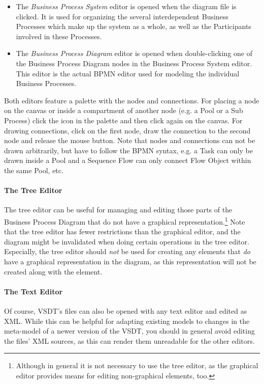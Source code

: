 \begin{itemize}
	\item The \emph{Business Process System} editor is opened when the diagram
	file is clicked.  It is used for organizing the several interdependent Business
	Processes which make up the system as a whole, as well as the Participants
	involved in these Processes.
	
	\item The \emph{Business Process Diagram} editor is opened when double-clicking
	one of the Business Process Diagram nodes in the Business Process System
	editor.  This editor is the actual BPMN editor used for modeling the
	individual Business Processes.
\end{itemize}

Both editors feature a palette with the nodes and connections.  For placing a
node on the canvas or inside a compartment of another node (e.g. a Pool or a Sub
Process) click the icon in the palette and then click again on the canvas.  For
drawing connections, click on the first node, draw the connection to the second
node and release the mouse button.  Note that nodes and connections can not be
drawn arbitrarily, but have to follow the BPMN syntax, e.g. a Task can only be
drawn inside a Pool and a Sequence Flow can only connect Flow Object within the
same Pool, etc.

\paragraph*{The Tree Editor}
The tree editor can be useful for managing and editing those parts of the Business
Process Diagram that do not have a graphical representation.\footnote{Although in
general it is not necessary to use the tree editor, as the graphical editor
provides means for editing non-graphical elements, too.} Note that the tree editor
has fewer restrictions than the graphical editor, and the diagram might be
invalidated when doing certain operations in the tree editor.  Especially, the
tree editor should \emph{not} be used for creating any elements that \emph{do}
have a graphical representation in the diagram, as this representation will not
be created along with the element.

\paragraph*{The Text Editor}
Of course, VSDT's files can also be opened with any text editor and edited as
XML.  While this can be helpful for adapting existing models to changes in the
meta-model of a newer version of the VSDT, you should in general avoid editing the
files' XML sources, as this can render them unreadable for the other editors.

